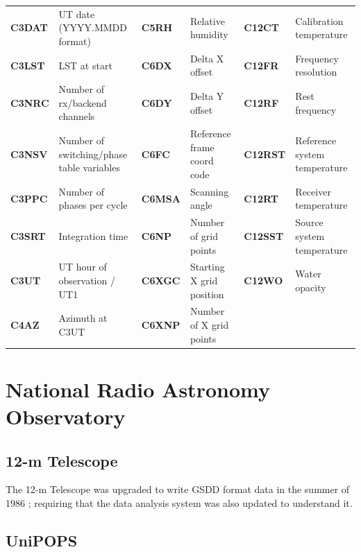 \documentclass[final,authoryear,5p,times,twocolumn]{elsarticle}
\begin{document}
\begin{table}[t]
\begin{tabular}{|lp{1.5in}|lp{1.5in}|lp{1.5in}|}
\textbf{C3DAT} & UT date (YYYY.MMDD format) & \textbf{C5RH} & Relative humidity & \textbf{C12CT} & Calibration temperature \\
\textbf{C3LST} & LST at start & \textbf{C6DX} & Delta X offset & \textbf{C12FR} & Frequency resolution \\
\textbf{C3NRC} & Number of rx/backend channels & \textbf{C6DY} & Delta Y offset & \textbf{C12RF} & Rest frequency \\
\textbf{C3NSV} & Number of switching/phase table variables & \textbf{C6FC} & Reference frame coord code & \textbf{C12RST} & Reference system temperature \\
\textbf{C3PPC} & Number of phases per cycle & \textbf{C6MSA} & Scanning angle & \textbf{C12RT} & Receiver temperature \\
\textbf{C3SRT} & Integration time & \textbf{C6NP} & Number of grid points & \textbf{C12SST} & Source system temperature \\
\textbf{C3UT} & UT hour of observation / UT1 & \textbf{C6XGC} & Starting X grid position & \textbf{C12WO} & Water opacity \\
\textbf{C4AZ} & Azimuth at C3UT & \textbf{C6XNP} & Number of X grid points &   &   \\
\hline
\end{tabular}
\end{table}

\section{National Radio Astronomy Observatory}

\subsection{12-m Telescope}

The 12-m Telescope was upgraded to write GSDD format data in the
summer of 1986 \citep{tcus23,1987NRAO30}; requiring that the data
analysis system was also updated to understand it.

\subsection{UniPOPS}
\end{document}
